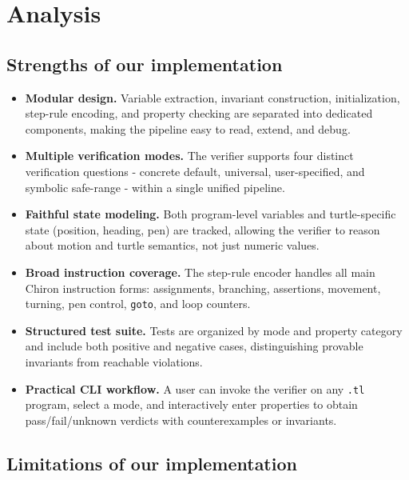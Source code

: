 \section*{Analysis}

\subsection*{Strengths of our implementation}

\begin{itemize}[leftmargin=1.5em]
    \item \textbf{Modular design.} Variable extraction, invariant construction, initialization, step-rule encoding, and property checking are separated into dedicated components, making the pipeline easy to read, extend, and debug.
    \item \textbf{Multiple verification modes.} The verifier supports four distinct verification questions - concrete default, universal, user-specified, and symbolic safe-range - within a single unified pipeline.
    \item \textbf{Faithful state modeling.} Both program-level variables and turtle-specific state (position, heading, pen) are tracked, allowing the verifier to reason about motion and turtle semantics, not just numeric values.
    \item \textbf{Broad instruction coverage.} The step-rule encoder handles all main Chiron instruction forms: assignments, branching, assertions, movement, turning, pen control, \texttt{goto}, and loop counters.
    \item \textbf{Structured test suite.} Tests are organized by mode and property category and include both positive and negative cases, distinguishing provable invariants from reachable violations.
    \item \textbf{Practical CLI workflow.} A user can invoke the verifier on any \texttt{.tl} program, select a mode, and interactively enter properties to obtain pass/fail/unknown verdicts with counterexamples or invariants.
\end{itemize}

\subsection*{Limitations of our implementation}

